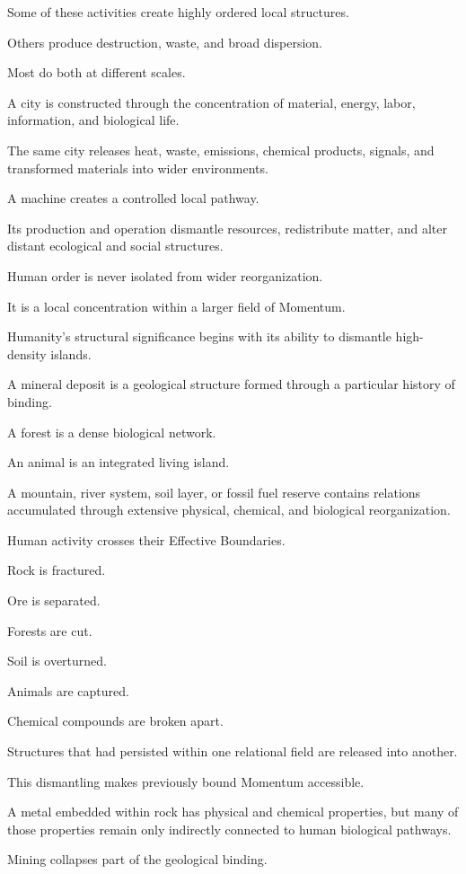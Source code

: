 Some of these activities create highly ordered local structures.

Others produce destruction, waste, and broad dispersion.

Most do both at different scales.

A city is constructed through the concentration of material, energy, labor, information, and biological life.

The same city releases heat, waste, emissions, chemical products, signals, and transformed materials into wider environments.

A machine creates a controlled local pathway.

Its production and operation dismantle resources, redistribute matter, and alter distant ecological and social structures.

Human order is never isolated from wider reorganization.

It is a local concentration within a larger field of Momentum.

Humanity’s structural significance begins with its ability to dismantle high-density islands.

A mineral deposit is a geological structure formed through a particular history of binding.

A forest is a dense biological network.

An animal is an integrated living island.

A mountain, river system, soil layer, or fossil fuel reserve contains relations accumulated through extensive physical, chemical, and biological reorganization.

Human activity crosses their Effective Boundaries.

Rock is fractured.

Ore is separated.

Forests are cut.

Soil is overturned.

Animals are captured.

Chemical compounds are broken apart.

Structures that had persisted within one relational field are released into another.

This dismantling makes previously bound Momentum accessible.

A metal embedded within rock has physical and chemical properties, but many of those properties remain only indirectly connected to human biological pathways.

Mining collapses part of the geological binding.

